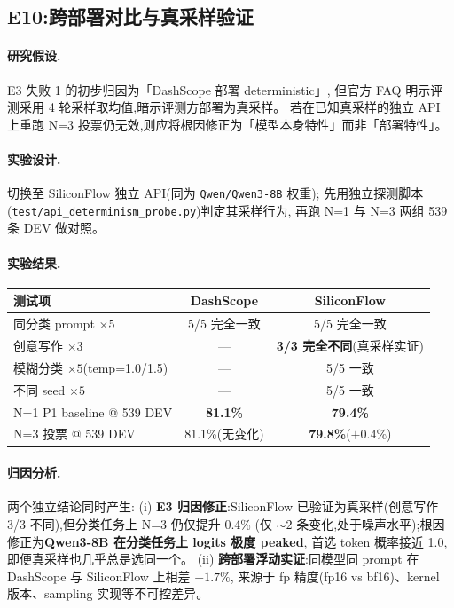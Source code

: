 \documentclass[11pt,a4paper]{ctexart}
\begin{document}
\subsection{E10:跨部署对比与真采样验证}

\paragraph{研究假设.}E3 失败 1 的初步归因为「DashScope 部署 deterministic」,
但官方 FAQ 明示评测采用 4 轮采样取均值,暗示评测方部署为真采样。
若在已知真采样的独立 API 上重跑 N=3 投票仍无效,则应将根因修正为「模型本身特性」而非「部署特性」。

\paragraph{实验设计.}切换至 SiliconFlow 独立 API(同为 \texttt{Qwen/Qwen3-8B} 权重);
先用独立探测脚本(\texttt{test/api\_determinism\_probe.py})判定其采样行为,
再跑 N=1 与 N=3 两组 539 条 DEV 做对照。

\paragraph{实验结果.}

\begin{table}[h]
\centering
\small
\begin{tabular}{lcc}
\toprule
测试项 & DashScope & SiliconFlow \\
\midrule
同分类 prompt $\times 5$            & 5/5 完全一致 & 5/5 完全一致 \\
创意写作 $\times 3$                 & ---          & \textbf{3/3 完全不同}(真采样实证) \\
模糊分类 $\times 5$(temp=1.0/1.5)  & ---          & 5/5 一致 \\
不同 seed $\times 5$                & ---          & 5/5 一致 \\
\midrule
N=1 P1 baseline @ 539 DEV           & \textbf{81.1\%} & \textbf{79.4\%} \\
N=3 投票 @ 539 DEV                  & 81.1\%(无变化) & \textbf{79.8\%}($+0.4\%$) \\
\bottomrule
\end{tabular}
\end{table}

\paragraph{归因分析.}两个独立结论同时产生:
(i) \textbf{E3 归因修正}:SiliconFlow 已验证为真采样(创意写作 3/3 不同),但分类任务上 N=3 仍仅提升 0.4\%
(仅 $\sim 2$ 条变化,处于噪声水平);根因修正为\textbf{Qwen3-8B 在分类任务上 logits 极度 peaked},
首选 token 概率接近 1.0,即便真采样也几乎总是选同一个。
(ii) \textbf{跨部署浮动实证}:同模型同 prompt 在 DashScope 与 SiliconFlow 上相差 $-1.7\%$,
来源于 fp 精度(fp16 vs bf16)、kernel 版本、sampling 实现等不可控差异。
\end{document}

